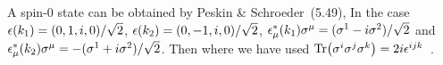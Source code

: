 \documentclass[11pt]{article}
\begin{document}
{	A spin-0 state can be obtained by Peskin \& Schroeder~(5.49),
	In the case $\epsilon(k_1) = (0, 1, i, 0) / \sqrt{2}$, $\epsilon(k_2) = (0, -1, i, 0) / \sqrt{2}$, $\epsilon_\mu^*(k_1) \sigma^\mu = (\sigma^1 - i \sigma^2) / \sqrt{2}$ and $\epsilon_\mu^*(k_2) \sigma^\mu = -(\sigma^1 + i \sigma^2) / \sqrt{2}$.  Then
	where we have used $\Tr(\sigma^i \sigma^j \sigma^k) = 2i \epsilon^{i j k}$~\cite{Pauli}.
	
}
\end{document}
